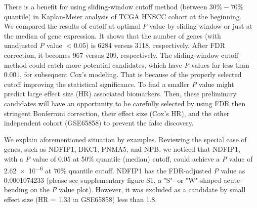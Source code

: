 \documentclass[preprint,12pt]{elsarticle}
\newenvironment{MyIndent}
{\par\leftskip1cm\relax\rightskip1cm\relax}
{\par\leftskip0cm\relax\rightskip0cm\relax}
\newenvironment{MyColorPar}[1]{%
    \leavevmode\color{#1}\ignorespaces%
}{%
}%
\begin{document}
\begin{MyColorPar}{blue}
\begin{MyIndent}
\begin{MyColorPar}{red}
There is a benefit for using sliding-window cutoff method (between $30\% - 70\%$ quantile) in Kaplan-Meier analysis of TCGA HNSCC cohort at the beginning.
We compared the results of cutoff at optimal \textit{P} value by sliding window or just at the median of gene expression.
It shows that the number of genes (with unadjusted \textit{P} value $< 0.05$)  is 6284 versus 3118, respectively. After FDR correction, it becomes 967 versus 209, respectively.
The sliding-window cutoff method could catch more potential candidates, which have \textit{P} values far less than $0.001$, for subsequent Cox's modeling.
That is because of the properly selected cutoff improving the statistical significance.
To find a smaller \textit{P} value might predict large effect size (HR) associated biomarkers.
Then, these preliminary candidates will have an opportunity to be carefully selected by using FDR then stringent Bonferroni correction, their effect size (Cox's HR), and the other independent cohort (GSE65858) to prevent the false discovery.

We explain aforementioned situation by examples.
Reviewing the special case of genes, such as NDFIP1, DKC1, PNMA5, and NPB,
we noticed that NDFIP1, with a \textit{P} value of 0.05 at 50\% quantile (median) cutoff, could achieve a \textit{P} value of \num{2.62e-6} at 70\% quantile cutoff.
NDFIP1 has the FDR-adjusted \textit{P} value as \num[round-precision=3, round-mode=figures,
scientific-notation=true]{0.0001074233} (please see supplementary figure S1, a "S"- or "W"-shaped acute-bending on the \textit{P} value plot). %
However, it was excluded as a candidate by small effect size (HR = 1.33 in GSE65858) less than 1.8.


\end{MyColorPar}
\end{MyIndent}
\end{MyColorPar}
\end{document}
